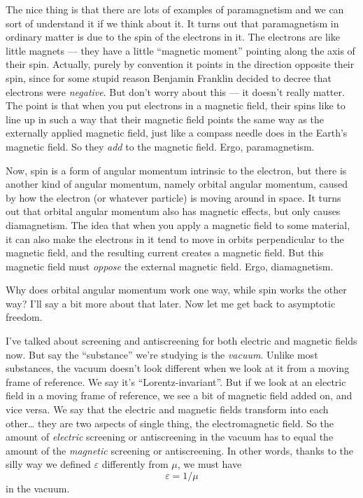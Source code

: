 \documentclass{article}
\begin{document}
The nice thing is that there are lots of examples of paramagnetism and
we can sort of understand it if we think about it. It turns out that
paramagnetism in ordinary matter is due to the spin of the electrons in
it. The electrons are like little magnets --- they have a little
``magnetic moment'' pointing along the axis of their spin. Actually,
purely by convention it points in the direction opposite their spin,
since for some stupid reason Benjamin Franklin decided to decree that
electrons were \emph{negative}. But don't worry about this --- it
doesn't really matter. The point is that when you put electrons in a
magnetic field, their spins like to line up in such a way that their
magnetic field points the same way as the externally applied magnetic
field, just like a compass needle does in the Earth's magnetic field. So
they \emph{add} to the magnetic field. Ergo, paramagnetism.

Now, spin is a form of angular momentum intrinsic to the electron, but
there is another kind of angular momentum, namely orbital angular
momentum, caused by how the electron (or whatever particle) is moving
around in space. It turns out that orbital angular momentum also has
magnetic effects, but only causes diamagnetism. The idea that when you
apply a magnetic field to some material, it can also make the electrons
in it tend to move in orbits perpendicular to the magnetic field, and
the resulting current creates a magnetic field. But this magnetic field
must \emph{oppose} the external magnetic field. Ergo, diamagnetism.

Why does orbital angular momentum work one way, while spin works the
other way? I'll say a bit more about that later. Now let me get back to
asymptotic freedom.

I've talked about screening and antiscreening for both electric and
magnetic fields now. But say the ``substance'' we're studying is the
\emph{vacuum}. Unlike most substances, the vacuum doesn't look different
when we look at it from a moving frame of reference. We say it's
``Lorentz-invariant''. But if we look at an electric field in a moving
frame of reference, we see a bit of magnetic field added on, and vice
versa. We say that the electric and magnetic fields transform into each
other\ldots{} they are two aspects of single thing, the electromagnetic
field. So the amount of \emph{electric} screening or antiscreening in
the vacuum has to equal the amount of the \emph{magnetic} screening or
antiscreening. In other words, thanks to the silly way we defined
\(\varepsilon\) differently from \(\mu\), we must have
\[\varepsilon = 1/\mu\] in the vacuum.
\end{document}
